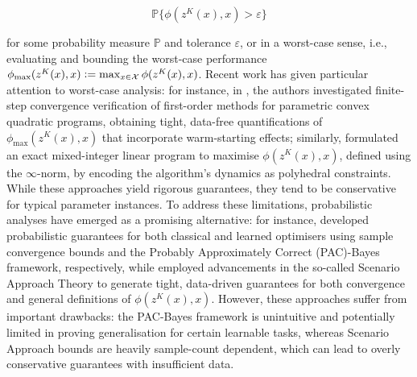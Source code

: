 \begin{equation}\label{eq:probabilistic_guarantee}
\mathbb{P}\{\phi(z^K(x),x) > \varepsilon\}
\end{equation}

for some probability measure $\mathbb{P}$ and tolerance $\varepsilon$, or in a worst-case sense, i.e., evaluating and bounding the worst-case performance $\phi_{\max}(z^K(x),x) \vcentcolon= \max_{x\in\mathcal{X}} \phi(z^K(x),x)$. Recent work has given particular attention to worst-case analysis: for instance, in \cite{VRBS25}, the authors investigated finite-step convergence verification of first-order methods for parametric convex quadratic programs, obtaining tight, data-free quantifications of $\phi_{\max}(z^K(x),x)$ that incorporate warm-starting effects; similarly, \cite{VRBS+24} formulated an exact mixed-integer linear program to maximise $\phi(z^K(x),x)$, defined using the $\infty$-norm, by encoding the algorithm’s dynamics as polyhedral constraints. While these approaches yield rigorous guarantees, they tend to be conservative for typical parameter instances. To address these limitations, probabilistic analyses have emerged as a promising alternative: for instance, \cite{RSBS25} developed probabilistic guarantees for both classical and learned optimisers using sample convergence bounds and the Probably Approximately Correct (PAC)-Bayes framework, respectively, while \cite{JHKM+25} employed advancements in the so-called Scenario Approach Theory to generate tight, data-driven guarantees for both convergence and general definitions of $\phi(z^K(x),x)$. However, these approaches suffer from important drawbacks: the PAC-Bayes framework is unintuitive and potentially limited in proving generalisation for certain learnable tasks, whereas Scenario Approach bounds are heavily sample-count dependent, which can lead to overly conservative guarantees with insufficient data.